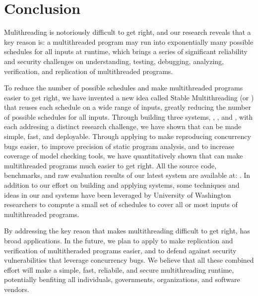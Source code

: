 \chapter{Conclusion} \label{sec:conclusion}

Mulithreading is notoriously difficult to get right, and our research reveals
that a key reason is: a multithreaded program may run into exponentially many
possible schedules for all inputs at runtime, which brings a series of
significant reliability and security challenges on understanding,
testing, debugging, analyzing, verification, and replication of multithreaded
programs.

To reduce the number of possible schedules and make multithreaded
programs easier to get right, we have invented a new idea called Stable
Multithreading (or \smt) that reuses each schedule on a wide range of inputs,
greatly reducing the number of possible schedules for all inputs. Through
building three \smt systems, \tern, \peregrine, and \parrot, with each addresing
a distinct research challenge, we have shown that \smt can be made simple, fast,
and deployable. Through applying \smt to make reproducing concurrency bugs
easier, to improve precision of static program analysis, and to increase
coverage of model checking tools, we have quantitatively shown that \smt can
make multithreaded programs much easier to get right. All the source code,
benchmarks, and raw evaluation results of our latest \smt system \parrot are
available at: \github. In addition to our effort on building and applying \smt
systems, some techniques and ideas in our \tern and \peregrine systems have been
leveraged by University of Washington researchers to compute a small set of
schedules to cover all or most inputs of multithreaded programs.

By addressing the key reaon that makes multithreading difficult to get right,
\smt has broad applications. In the future, we plan to apply \smt to make
replication and verification of multitheraded programs easier, and to defend
against security vulnerabilities that leverage concurrency bugs. We believe that
all these combined effort will make \smt a simple, fast, reliabile, and secure
multithreading runtime, potentially benfiting all individuals, governments,
organizations, and software vendors. 